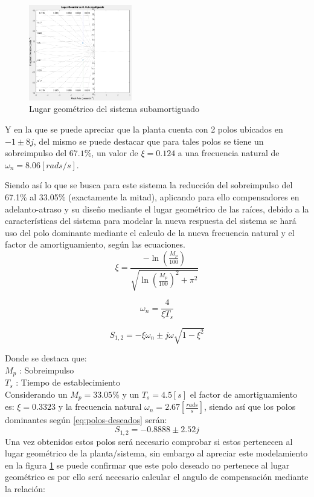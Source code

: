 \documentclass[conference]{IEEEtran}
\begin{document}
	
	\begin{figure}[h]
		\centering
		\includegraphics[width=0.4\textwidth]{media1/lgr_planta}
		\caption{Lugar geométrico del sistema subamortiguado}
		\label{fig:lgrplanta}
	\end{figure}
	
	Y en la que se puede apreciar que la planta cuenta con 2 polos ubicados en $-1 \pm 8j$, del mismo se puede destacar que para tales polos se tiene un sobreimpulso del $67.1\%$, un valor de $\xi = 0.124$ a una frecuencia natural de $\omega_n = 8.06 [rads/s]$.
	
	Siendo así lo que se busca para este sistema la reducción del sobreimpulso del 67.1$\%$ al 33.05$\%$ (exactamente la mitad), aplicando para ello  compensadores en adelanto-atraso y su diseño mediante el lugar geométrico de las raíces, debido a la características del sistema para modelar la nueva respuesta del sistema se hará uso del polo dominante mediante el calculo de la nueva frecuencia natural y el factor de amortiguamiento, según las ecuaciones.
	\begin{equation}
		\xi = \frac{-\ln(\frac{M_p}{100})}{\sqrt{\ln(\frac{M_p}{100})^2 + \pi^2}}
		\label{eq:factor-amortiguamiento} 	
	\end{equation}
	
	\begin{equation}
		\omega_n = \frac{4}{\xi T_s}
		\label{eq:frecuencia-natural}
	\end{equation}
	
	\begin{equation}
		S_{1,2} = -\xi \omega_n \pm j\omega \sqrt{1-\xi^2}
		\label{eq:polos-deseados}
	\end{equation}
	
	Donde se destaca que: \\
	$M_p$ : Sobreimpulso \\
	$T_s$ : Tiempo de establecimiento\\
	
	Considerando un $M_p = 33.05\% $ y un $T_s = 4.5[s]$ el factor de amortiguamiento es: $\xi = 0.3323$ y la frecuencia natural $\omega_n =  2.67[\frac{rads}{s}]$, siendo así que los polos dominantes según \ref{eq:polos-deseados} serán:
	\begin{equation}
		S_{1,2} = -0.8888 \pm 2.52j
		\label{eq:polos-dominantes-sub}
	\end{equation}
	Una vez obtenidos estos polos será necesario comprobar si estos pertenecen al lugar geométrico de la planta/sistema, sin embargo al apreciar este modelamiento en la figura \ref{fig:lgrplanta} se puede confirmar que este polo deseado no pertenece al lugar geométrico es por ello será necesario calcular el angulo de compensación mediante la relación:
	
\end{document}
